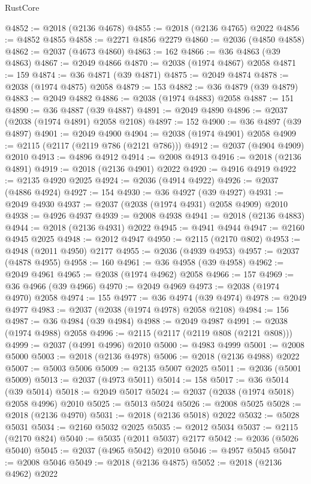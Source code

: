 \begin{lexlean}{RustCore}
\begin{coremodule}
@4852 := @2018 (@2136 @4678)
@4855 := @2018 (@2136 @4765) @2022
@4856 := @4852 @4855
@4858 := @2271 @4856 @2279
@4860 := @2036 (@4850 @4858)
@4862 := @2037 (@4673 @4860)
@4863 := 162
@4866 := @36 @4863 (@39 @4863)
@4867 := @2049 @4866
@4870 := @2038 (@1974 @4867) @2058
@4871 := 159
@4874 := @36 @4871 (@39 @4871)
@4875 := @2049 @4874
@4878 := @2038 (@1974 @4875) @2058
@4879 := 153
@4882 := @36 @4879 (@39 @4879)
@4883 := @2049 @4882
@4886 := @2038 (@1974 @4883) @2058
@4887 := 151
@4890 := @36 @4887 (@39 @4887)
@4891 := @2049 @4890
@4896 := @2037 (@2038 (@1974 @4891) @2058 @2108)
@4897 := 152
@4900 := @36 @4897 (@39 @4897)
@4901 := @2049 @4900
@4904 := @2038 (@1974 @4901) @2058
@4909 := @2115 (@2117 (@2119 @786 (@2121 @786)))
@4912 := @2037 (@4904 @4909) @2010
@4913 := @4896 @4912
@4914 := @2008 @4913
@4916 := @2018 (@2136 @4891)
@4919 := @2018 (@2136 @4901) @2022
@4920 := @4916 @4919
@4922 := @2135 @4920 @2025
@4924 := @2036 (@4914 @4922)
@4926 := @2037 (@4886 @4924)
@4927 := 154
@4930 := @36 @4927 (@39 @4927)
@4931 := @2049 @4930
@4937 := @2037 (@2038 (@1974 @4931) @2058 @4909) @2010
@4938 := @4926 @4937
@4939 := @2008 @4938
@4941 := @2018 (@2136 @4883)
@4944 := @2018 (@2136 @4931) @2022
@4945 := @4941 @4944
@4947 := @2160 @4945 @2025
@4948 := @2012 @4947
@4950 := @2115 (@2170 @802)
@4953 := @4948 (@2011 @4950) @2177
@4955 := @2036 (@4939 @4953)
@4957 := @2037 (@4878 @4955)
@4958 := 160
@4961 := @36 @4958 (@39 @4958)
@4962 := @2049 @4961
@4965 := @2038 (@1974 @4962) @2058
@4966 := 157
@4969 := @36 @4966 (@39 @4966)
@4970 := @2049 @4969
@4973 := @2038 (@1974 @4970) @2058
@4974 := 155
@4977 := @36 @4974 (@39 @4974)
@4978 := @2049 @4977
@4983 := @2037 (@2038 (@1974 @4978) @2058 @2108)
@4984 := 156
@4987 := @36 @4984 (@39 @4984)
@4988 := @2049 @4987
@4991 := @2038 (@1974 @4988) @2058
@4996 := @2115 (@2117 (@2119 @808 (@2121 @808)))
@4999 := @2037 (@4991 @4996) @2010
@5000 := @4983 @4999
@5001 := @2008 @5000
@5003 := @2018 (@2136 @4978)
@5006 := @2018 (@2136 @4988) @2022
@5007 := @5003 @5006
@5009 := @2135 @5007 @2025
@5011 := @2036 (@5001 @5009)
@5013 := @2037 (@4973 @5011)
@5014 := 158
@5017 := @36 @5014 (@39 @5014)
@5018 := @2049 @5017
@5024 := @2037 (@2038 (@1974 @5018) @2058 @4996) @2010
@5025 := @5013 @5024
@5026 := @2008 @5025
@5028 := @2018 (@2136 @4970)
@5031 := @2018 (@2136 @5018) @2022
@5032 := @5028 @5031
@5034 := @2160 @5032 @2025
@5035 := @2012 @5034
@5037 := @2115 (@2170 @824)
@5040 := @5035 (@2011 @5037) @2177
@5042 := @2036 (@5026 @5040)
@5045 := @2037 (@4965 @5042) @2010
@5046 := @4957 @5045
@5047 := @2008 @5046
@5049 := @2018 (@2136 @4875)
@5052 := @2018 (@2136 @4962) @2022

\end{coremodule}
\end{lexlean}
